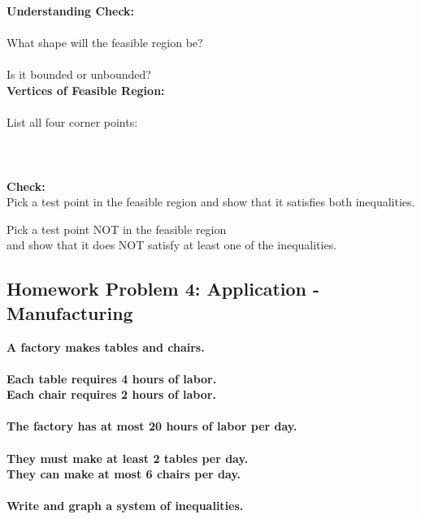 \documentclass[12pt]{article}
\begin{document}
	        \newpage
	
	        \textbf{Understanding Check:}\\\\
		    What shape will the feasible region be? \underline{\hspace{2in}}\\\\
		    Is it bounded or unbounded? \underline{\hspace{2in}}\\
	
        	\textbf{Vertices of Feasible Region:}\\\\
		    List all four corner points:\\\\
			\hspace{1cm} \underline{\hspace{6in}}\\\\
	
	        \textbf{Check:}\\
		    Pick a test point in the feasible region and show that it satisfies both inequalities.
		
		    \vspace{3cm}
		
		    Pick a test point NOT in the feasible region\\
			and show that it does NOT satisfy at least one of the inequalities.\\
	
	        \newpage
	
	    \subsection*{Homework Problem 4: Application - Manufacturing}
		
            \textbf{A factory makes tables and chairs.\\\\
		    Each table requires 4 hours of labor.\\
		    Each chair requires 2 hours of labor.\\\\
		    The factory has at most 20 hours of labor per day.\\\\
		    They must make at least 2 tables per day.\\
		    They can make at most 6 chairs per day.\\\\
		    Write and graph a system of inequalities.}\\
	
\end{document}
